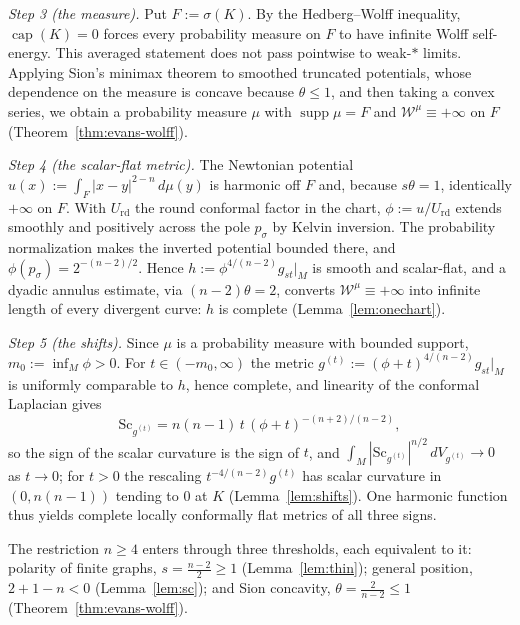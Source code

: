 \documentclass[12pt,oneside,a4paper]{article}
\theoremstyle{mytheorem}
\theoremstyle{remark}
\theoremstyle{definition}
\begin{document}
\noindent\emph{Step 3 (the measure).}
Put \(F:=\sigma(K)\).  By the Hedberg--Wolff inequality,
\(\operatorname{cap}(K)=0\) forces every probability measure on \(F\) to
have infinite Wolff self-energy.  This averaged statement does not pass
pointwise to weak-\(*\) limits.  Applying Sion's minimax theorem to
smoothed truncated potentials, whose dependence on the measure is
concave because \(\theta\leq1\), and then taking a convex series, we
obtain a probability measure \(\mu\) with
\(\operatorname{supp}\mu=F\) and \(\mathcal{W}^\mu\equiv+\infty\) on \(F\)
(Theorem~\ref{thm:evans-wolff}).


\noindent\emph{Step 4 (the scalar-flat metric).}
The Newtonian potential \(u(x):=\int_F|x-y|^{2-n}\,d\mu(y)\) is harmonic
off \(F\) and, because \(s\theta=1\), identically \(+\infty\) on \(F\).
With \(U_{\mathrm{rd}}\) the round conformal factor in the chart,
\(\phi:=u/U_{\mathrm{rd}}\) extends
smoothly and positively across the pole \(p_\sigma\) by Kelvin inversion.
The probability normalization makes the inverted potential bounded there,
and \(\phi(p_\sigma)=2^{-(n-2)/2}\).  Hence
\(h:=\phi^{4/(n-2)}g_{st}|_M\) is smooth and scalar-flat, and a
dyadic annulus estimate, via \((n-2)\theta=2\), converts
\(\mathcal{W}^\mu\equiv+\infty\) into infinite length of every divergent
curve: \(h\) is complete (Lemma~\ref{lem:onechart}).

\noindent\emph{Step 5 (the shifts).}
Since \(\mu\) is a probability measure with bounded support,
\(m_0:=\inf_M\phi>0\).  For \(t\in(-m_0,\infty)\) the metric
\(g^{(t)}:=(\phi+t)^{4/(n-2)}g_{st}|_M\) is uniformly comparable
to \(h\), hence complete, and linearity of the conformal Laplacian gives
\[
\mathrm{Sc}_{g^{(t)}}=n(n-1)\,t\,(\phi+t)^{-(n+2)/(n-2)},
\]
so the sign of the scalar curvature is the sign of \(t\), and
\(\int_M|\mathrm{Sc}_{g^{(t)}}|^{n/2}\,dV_{g^{(t)}}\to0\) as
\(t\to0\); for \(t>0\) the rescaling \(t^{-4/(n-2)}g^{(t)}\) has
scalar curvature in \((0,n(n-1))\) tending to \(0\) at \(K\)
(Lemma~\ref{lem:shifts}).  One harmonic function thus yields complete
locally conformally flat metrics of all three signs.


The restriction \(n\geq4\) enters through three thresholds, each
equivalent to it: polarity of finite graphs, \(s=\frac{n-2}2\geq1\)
(Lemma~\ref{lem:thin}); general position, \(2+1-n<0\)
(Lemma~\ref{lem:sc}); and Sion concavity, \(\theta=\frac2{n-2}\leq1\)
(Theorem~\ref{thm:evans-wolff}).
\end{document}
